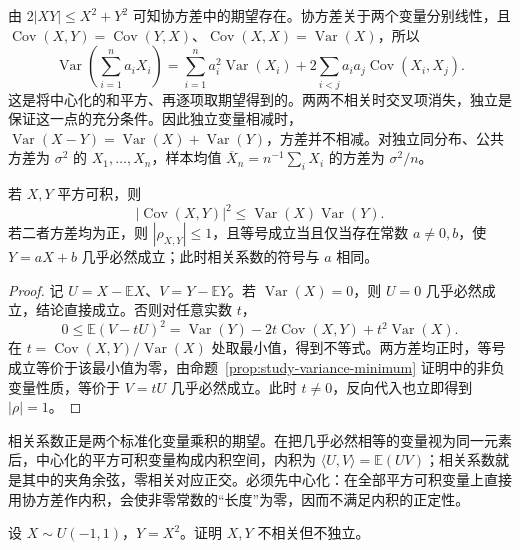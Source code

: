 由 $2|XY|\le X^2+Y^2$ 可知协方差中的期望存在。协方差关于两个变量分别线性，且 $\operatorname{Cov}(X,Y)=\operatorname{Cov}(Y,X)$、$\operatorname{Cov}(X,X)=\operatorname{Var}(X)$，所以
\begin{equation}
  \operatorname{Var}\left(\sum_{i=1}^na_iX_i\right)
    =\sum_{i=1}^na_i^2\operatorname{Var}(X_i)
      +2\sum_{i<j}a_ia_j\operatorname{Cov}(X_i,X_j).
  \label{eq:study-variance-linear-combination}
\end{equation}
这是将中心化的和平方、再逐项取期望得到的。两两不相关时交叉项消失，独立是保证这一点的充分条件。因此独立变量相减时，$\operatorname{Var}(X-Y)=\operatorname{Var}(X)+\operatorname{Var}(Y)$，方差并不相减。对独立同分布、公共方差为 $\sigma^2$ 的 $X_1,\ldots,X_n$，样本均值 $\overline X_n=n^{-1}\sum_iX_i$ 的方差为 $\sigma^2/n$。

\begin{proposition}
\label{prop:study-correlation-bound}
若 $X,Y$ 平方可积，则
\begin{equation}
  |\operatorname{Cov}(X,Y)|^2
    \le\operatorname{Var}(X)\operatorname{Var}(Y).
  \label{eq:study-covariance-cauchy-schwarz}
\end{equation}
若二者方差均为正，则 $|\rho_{X,Y}|\le1$，且等号成立当且仅当存在常数 $a\ne0,b$，使 $Y=aX+b$ 几乎必然成立；此时相关系数的符号与 $a$ 相同。
\end{proposition}

\begin{proof}
记 $U=X-\mathbb E X$、$V=Y-\mathbb E Y$。若 $\operatorname{Var}(X)=0$，则 $U=0$ 几乎必然成立，结论直接成立。否则对任意实数 $t$，
\[
  0\le\mathbb E(V-tU)^2
    =\operatorname{Var}(Y)-2t\operatorname{Cov}(X,Y)
       +t^2\operatorname{Var}(X).
\]
在 $t=\operatorname{Cov}(X,Y)/\operatorname{Var}(X)$ 处取最小值，得到不等式。两方差均正时，等号成立等价于该最小值为零，由命题~\ref{prop:study-variance-minimum} 证明中的非负变量性质，等价于 $V=tU$ 几乎必然成立。此时 $t\ne0$，反向代入也立即得到 $|\rho|=1$。
\end{proof}

相关系数正是两个标准化变量乘积的期望。在把几乎必然相等的变量视为同一元素后，中心化的平方可积变量构成内积空间，内积为 $\langle U,V\rangle=\mathbb E(UV)$；相关系数就是其中的夹角余弦，零相关对应正交。必须先中心化：在全部平方可积变量上直接用协方差作内积，会使非零常数的“长度”为零，因而不满足内积的正定性。

\begin{example}
\label{ex:study-uncorrelated-dependent}
设 $X\sim U(-1,1)$，$Y=X^2$。证明 $X,Y$ 不相关但不独立。
\end{example}

